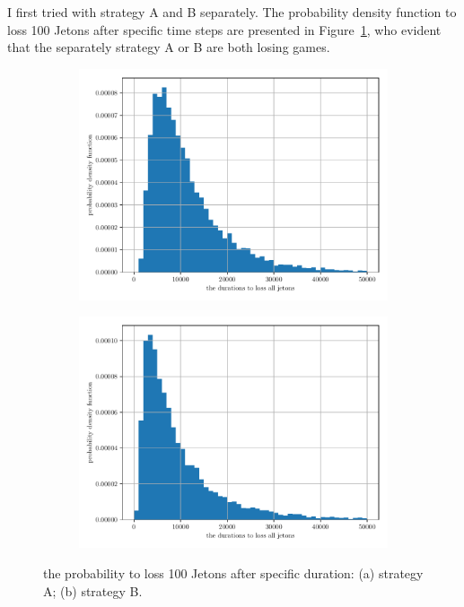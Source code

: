 \documentclass[paper=a4, fontsize=11pt]{scrartcl} %
\numberwithin{equation}{section} %
\numberwithin{figure}{section} %
\numberwithin{table}{section} %
\begin{document}
I first tried with strategy A and B separately. The probability density function to loss 100 Jetons after specific time steps are presented in Figure~\ref{fig:parrondos_1}, who evident that the separately strategy A or B are both losing games.\par
\begin{figure}[!ht]
	\centering
	\begin{subfigure}[b]{0.495\textwidth}
		\centering
		\includegraphics[width=\linewidth]{figure_3_a.pdf}
		\caption{}
	\end{subfigure}
	\begin{subfigure}[b]{0.495\textwidth}
		\centering
		\includegraphics[width=\linewidth]{figure_3_b.pdf}
		\caption{}
	\end{subfigure}
	\caption{the probability to loss 100 Jetons after specific duration: (a) strategy A; (b) strategy B.}
	\label{fig:parrondos_1}
\end{figure}
\end{document}
